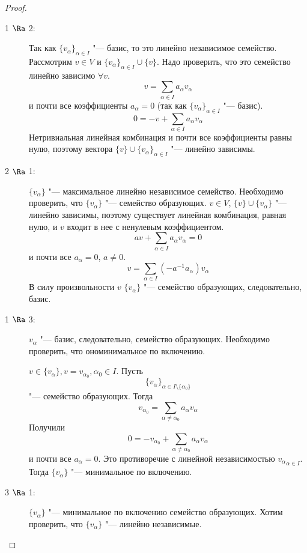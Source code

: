 \begin{proof}
	\begin{description}
	\item [1 $\Ra$ 2:]
		Так как $\{v_{\alpha}\}_{\alpha \in I}$ "--- базис, то это линейно независимое семейство.
		Рассмотрим $v \in V$ и $\{v_{\alpha}\}_{\alpha \in I} \cup \{v\}$.
		Надо проверить, что это семейство линейно зависимо $\forall v$.
		\[ v = \sum_{\alpha \in I} a_{\alpha}v_{\alpha} \]
		и почти все коэффициенты $a_{\alpha} = 0$ (так как $\{v_{\alpha}\}_{\alpha \in I}$ "--- базис).
		\[ 0 = -v + \sum_{\alpha \in I} a_{\alpha}v_{\alpha} \]
		Нетривиальная линейная комбинация и почти все коэффициенты равны нулю, поэтому вектора $\{v\} \cup \{v_{\alpha}\}_{\alpha \in I}$ "--- линейно зависимы.

	\item [2 $\Ra$ 1:]
		$\{v_{\alpha}\}$ "--- максимальное линейно независимое семейство.
		Необходимо проверить, что $\{v_{\alpha}\}$ "--- семейство образующих.
		$v \in V$, $\{v\} \cup \{v_{\alpha}\}$ "--- линейно зависимы, поэтому существует линейная комбинация, равная нулю,
		и $v$ входит в нее с ненулевым коэффициентом.
		\[ av + \sum_{\alpha \in I}a_{\alpha}v_{\alpha} = 0 \]
		и почти все $a_{\alpha} = 0$, $a \ne 0$.
		\[ v = \sum_{\alpha \in I}(-a^{-1}a_{\alpha})v_{\alpha} \]
		В силу произвольности $v$ $\{v_{\alpha}\}$ "--- семейство образующих, следовательно, базис.

	\item [1 $\Ra$ 3:]
		${v_{\alpha}}$ "--- базис, следовательно, семейство образующих.
		Необходимо проверить, что ономинимальное по включению.

		$v \in \{v_{\alpha}\}, v = v_{\alpha_0}, \alpha_0 \in I$.
		Пусть
		\[ \{v_{\alpha}\}_{\alpha \in I \setminus \{\alpha_0\}} \]
		"--- семейство образующих. Тогда
		\[ v_{\alpha_0} = \sum_{\alpha \ne \alpha_0} a_{\alpha}v_{\alpha} \]
		Получили
		\[ 0 = -v_{\alpha_0} + \sum_{\alpha \ne \alpha_0}a_{\alpha} v_{\alpha} \]
		и почти все $a_{\alpha} = 0$.
		Это противоречие с линейной независимостью ${v_\alpha}_{{\alpha} \in I}$.
		Тогда $\{v_{\alpha}\}$ "--- минимальное по включению.

	\item [3 $\Ra$ 1:]
		$\{v_{\alpha}\}$ "--- минимальное по включению семейство образующих.
		Хотим проверить, что $\{v_{\alpha}\}$ "--- линейно независимые.


\end{description}
\end{proof}
